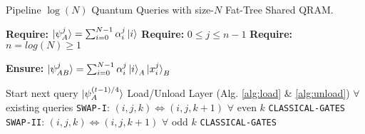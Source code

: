 \begin{algorithm}[h]
\caption{Pipeline $\log(N)$ Quantum Queries with size-$N$ Fat-Tree Shared QRAM.}\label{alg:query}
\begin{algorithmic}[1]

\State \textbf{Require: } $\ket{\psi_{A}^{j}} = \sum^{N-1}_{i=0} \alpha_i^j\ket{i}$
\State \textbf{Require: } $0 \leq j \leq n-1$ 
\State \textbf{Require: } $ n=log(N) \geq 1$

\State \textbf{Ensure: } $\ket{\psi_{AB}^{j}} = \sum_{i=0}^{N-1}\alpha_i^j\ket{i}_A\ket{x^j_i}_B$

        \State Start next query $\ket{\psi_{A}^{(t - 1) / 4}}$  
    \EndIf
    \State Load/Unload Layer (Alg. \ref{alg:load} \& \ref{alg:unload}) $\forall$ existing queries
\Else  
        \State \texttt{SWAP-I}: $(i,j,k) \Leftrightarrow(i,j,k+1)$ $\forall$ even $k$
            \State \texttt{CLASSICAL-GATES}
            \State {} 
        \EndIf
    \Else
        \State \texttt{SWAP-II}: $(i,j,k) \Leftrightarrow(i,j,k+1)$ $\forall$ odd $k$
            \State \texttt{CLASSICAL-GATES} 
            \State {} 
        \EndIf
    \EndIf
\EndIf
\EndFor
\end{algorithmic}
\end{algorithm}



